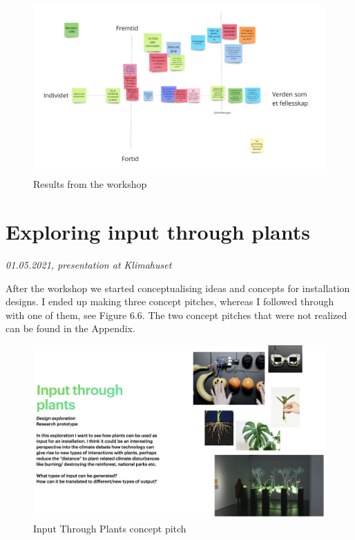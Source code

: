 \begin{figure}[H]
\includegraphics[width=12.5cm]{pictures/process/workshop_results.png}
\caption{Results from the workshop}
\centering 
\end{figure}

\break
\section{Exploring input through plants}
\par
\emph{01.05.2021, presentation at Klimahuset}
\par

After the workshop we started conceptualising ideas and concepts for installation designs. I ended up making three concept pitches, whereas I followed through with one of them, see Figure 6.6. The two concept pitches that were not realized can be found in the Appendix. 

\begin{figure}[H]
\centering 
\includegraphics[width=13cm]{pictures/process/plant_pitch.png}
\caption{Input Through Plants concept pitch}
\end{figure}

